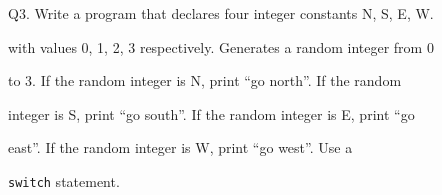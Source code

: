 Q3. Write a program that declares four integer constants N, S, E, W.

with values 0, 1, 2, 3 respectively. Generates a random integer from 0

to 3. If the random integer is N, print ``go north''. If the random

integer is S, print ``go south''. If the random integer is E, print ``go

east''. If the random integer is W, print ``go west''. Use a

\texttt{switch} statement.

